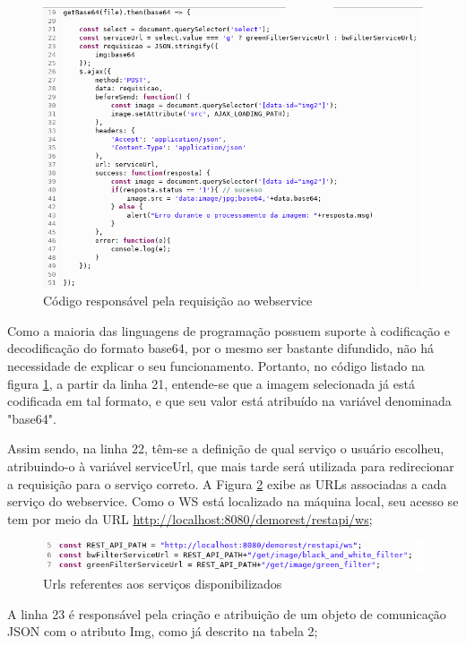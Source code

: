 \documentclass[12pt]{article}
\begin{document}
\begin{figure}[ht]
	\centering
	\includegraphics[width=.9\textwidth]{cliente-requisicao.png}
	\caption{Código responsável pela requisição ao webservice}
	\label{fig:Figura7}
\end{figure}

Como a maioria das linguagens de programação possuem suporte à codificação e decodificação do formato base64, por o mesmo ser bastante difundido, não há necessidade de explicar o seu funcionamento. Portanto, no código listado na figura \ref{fig:Figura7}, a partir da linha 21, entende-se que a imagem selecionada já está codificada em tal formato, e que seu valor está atribuído na variável denominada "base64". 

Assim sendo, na linha 22, têm-se a definição de qual serviço o usuário escolheu, atribuindo-o à variável serviceUrl, que mais tarde será utilizada para redirecionar a requisição para o serviço correto. A Figura \ref{fig:Figura8} exibe as URLs associadas a cada serviço do webservice. Como o WS está localizado na máquina local, seu acesso se tem por meio da URL \url{http://localhost:8080/demorest/restapi/ws}; 

\begin{figure}[ht]
	\centering
	\includegraphics[width=.9\textwidth]{caminho-servicos.png}
	\caption{Urls referentes aos serviços disponibilizados}
	\label{fig:Figura8}
\end{figure}

A linha 23 é responsável pela criação e atribuição de um objeto de comunicação JSON com o atributo Img, como já descrito na tabela 2; 
\end{document}
